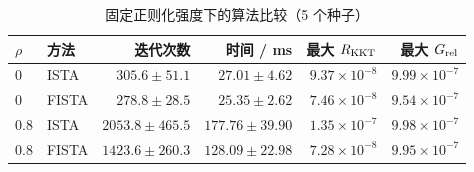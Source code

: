\begin{table}[htbp]
\centering\small
\caption{固定正则化强度下的算法比较（5 个种子）}\label{tab:benchmark}
\begin{tabular}{llrrrr}
\toprule
$\rho$ & 方法 & 迭代次数 & 时间 / ms & 最大 $R_{\rm KKT}$ & 最大 $G_{\rm rel}$ \\
\midrule
0 & ISTA & $305.6\pm51.1$ & $27.01\pm4.62$ & $9.37\times10^{-8}$ & $9.99\times10^{-7}$ \\
0 & FISTA & $278.8\pm28.5$ & $25.35\pm2.62$ & $7.46\times10^{-8}$ & $9.54\times10^{-7}$ \\
0.8 & ISTA & $2053.8\pm465.5$ & $177.76\pm39.90$ & $1.35\times10^{-7}$ & $9.98\times10^{-7}$ \\
0.8 & FISTA & $1423.6\pm260.3$ & $128.09\pm22.98$ & $7.28\times10^{-8}$ & $9.95\times10^{-7}$ \\
\bottomrule
\end{tabular}
\end{table}
